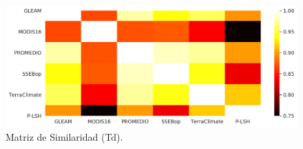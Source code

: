 \begin{figure}[htb]
	\includegraphics[scale=.665]{Images/03_Tindex_AEproducts.png}
	\centering
	\caption{Matriz de Similaridad (Td).}
	\label{fig:03_Tindex_AEproducts}
\end{figure}
